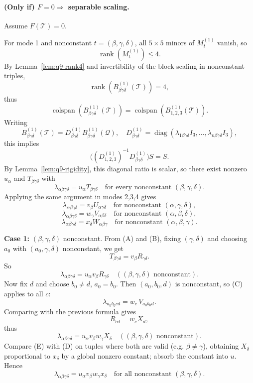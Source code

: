 \paragraph{(Only if) $F=0\Rightarrow$ separable scaling.}
Assume $F(\mathcal T)=0$.

For mode 1 and nonconstant $t=(\beta,\gamma,\delta)$, all $5\times5$ minors of $M^{(1)}_t$ vanish, so
\[
\operatorname{rank}(M^{(1)}_t)\le 4.
\]
By Lemma~\ref{lem:q9-rank4} and invertibility of the block scaling in nonconstant triples,
\[
\operatorname{rank}(B^{(1)}_{\beta\gamma\delta}(\mathcal T))=4,
\]
thus
\[
\operatorname{colspan}(B^{(1)}_{\beta\gamma\delta}(\mathcal T))
=
\operatorname{colspan}(B^{(1)}_{1,2,3}(\mathcal T)).
\]
Writing
\[
B^{(1)}_{\beta\gamma\delta}(\mathcal T)=D^{(1)}_{\beta\gamma\delta} B^{(1)}_{\beta\gamma\delta}(\mathcal Q),
\quad
D^{(1)}_{\beta\gamma\delta}=\operatorname{diag}(\lambda_{1\beta\gamma\delta}I_3,\dots,\lambda_{n\beta\gamma\delta}I_3),
\]
this implies
\[
\big((D^{(1)}_{1,2,3})^{-1}D^{(1)}_{\beta\gamma\delta}\big)S=S.
\]
By Lemma~\ref{lem:q9-rigidity}, this diagonal ratio is scalar, so there exist nonzero $u_\alpha$ and $T_{\beta\gamma\delta}$ with
\[
\lambda_{\alpha\beta\gamma\delta}=u_\alpha T_{\beta\gamma\delta}
\quad\text{for every nonconstant }(\beta,\gamma,\delta).
\tag{A}
\]
Applying the same argument in modes 2,3,4 gives
\[
\lambda_{\alpha\beta\gamma\delta}=v_\beta U_{\alpha\gamma\delta}
\quad\text{for nonconstant }(\alpha,\gamma,\delta),
\tag{B}
\]
\[
\lambda_{\alpha\beta\gamma\delta}=w_\gamma V_{\alpha\beta\delta}
\quad\text{for nonconstant }(\alpha,\beta,\delta),
\tag{C}
\]
\[
\lambda_{\alpha\beta\gamma\delta}=x_\delta W_{\alpha\beta\gamma}
\quad\text{for nonconstant }(\alpha,\beta,\gamma).
\tag{D}
\]

\textbf{Case 1:} $(\beta,\gamma,\delta)$ nonconstant.
From (A) and (B), fixing $(\gamma,\delta)$ and choosing $a_0$ with $(a_0,\gamma,\delta)$ nonconstant, we get
\[
T_{\beta\gamma\delta}=v_\beta R_{\gamma\delta}.
\]
So
\[
\lambda_{\alpha\beta\gamma\delta}=u_\alpha v_\beta R_{\gamma\delta}
\quad((\beta,\gamma,\delta)\text{ nonconstant}).
\]
Now fix $d$ and choose $b_0\neq d$, $a_0=b_0$. Then $(a_0,b_0,d)$ is nonconstant, so (C) applies to all $c$:
\[
\lambda_{a_0b_0cd}=w_c\,V_{a_0b_0d}.
\]
Comparing with the previous formula gives
\[
R_{cd}=w_c X_d,
\]
thus
\[
\lambda_{\alpha\beta\gamma\delta}=u_\alpha v_\beta w_\gamma X_\delta
\quad((\beta,\gamma,\delta)\text{ nonconstant}).
\tag{E}
\]
Compare (E) with (D) on tuples where both are valid (e.g. $\beta\neq\gamma$), obtaining $X_\delta$ proportional to $x_\delta$ by a global nonzero constant; absorb the constant into $u$.
Hence
\[
\lambda_{\alpha\beta\gamma\delta}=u_\alpha v_\beta w_\gamma x_\delta
\quad\text{for all nonconstant }(\beta,\gamma,\delta).
\tag{F}
\]


